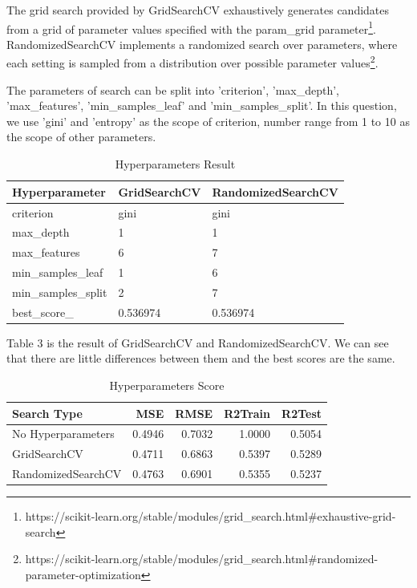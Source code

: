 \documentclass[UTF8]{ctexart}
\begin{document}
The grid search provided by GridSearchCV exhaustively generates candidates from a grid of parameter values specified with the param\_grid parameter\footnote{https://scikit-learn.org/stable/modules/grid\_search.html\#exhaustive-grid-search}. RandomizedSearchCV implements a randomized search over parameters, where each setting is sampled from a distribution over possible parameter values\footnote{https://scikit-learn.org/stable/modules/grid\_search.html\#randomized-parameter-optimization}.

The parameters of search can be split into 'criterion', 'max\_depth', 'max\_features', 'min\_samples\_leaf' and 'min\_samples\_split'. In this question, we use 'gini' and 'entropy' as the scope of criterion, number range from 1 to 10 as the scope of other parameters.

\begin{table}[htbp]
	\centering
	\begin{tabular}{lll}
		\toprule
		Hyperparameter      & GridSearchCV & RandomizedSearchCV \\
		\midrule
		criterion           & gini         & gini               \\
		max\_depth          & 1            & 1                  \\
		max\_features       & 6            & 7                  \\
		min\_samples\_leaf  & 1            & 6                  \\
		min\_samples\_split & 2            & 7                  \\
		\cline{1-3}
		best\_score\_       & 0.536974     & 0.536974           \\
		\bottomrule
	\end{tabular}
	\setlength{\abovecaptionskip}{0.3cm}
	\setlength{\belowcaptionskip}{0cm}

	\caption{Hyperparameters Result}
\end{table}

Table 3 is the result of GridSearchCV and RandomizedSearchCV. We can see that there are little differences between them and the best scores are the same.

\begin{table}[htbp]
	\centering
	\begin{tabular}{lrrrr}
		\toprule
		Search Type        & MSE    & RMSE   & R2Train & R2Test \\
		\midrule
		No Hyperparameters & 0.4946 & 0.7032 & 1.0000  & 0.5054 \\
		GridSearchCV       & 0.4711 & 0.6863 & 0.5397  & 0.5289 \\
		RandomizedSearchCV & 0.4763 & 0.6901 & 0.5355  & 0.5237 \\
		\bottomrule
	\end{tabular}

	\setlength{\abovecaptionskip}{0.3cm}
	\setlength{\belowcaptionskip}{0cm}

	\caption{Hyperparameters Score}
\end{table}
\end{document}
